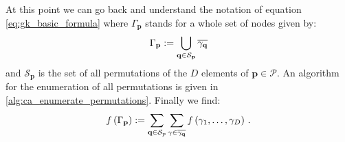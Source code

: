 \documentclass[a4paper,10pt]{article}
\begin{document}
At this point we can go back and understand
the notation of equation \eqref{eq:gk_basic_formula}
where $\Gamma_\mathbf{p}$ stands for a whole set of nodes given by:
\begin{equation}
  \Gamma_\mathbf{p} :=
  \bigcup_{\mathbf{q} \in \mathcal{S}_\mathbf{p}} \overline{\gamma_\mathbf{q}}
\end{equation}
and $\mathcal{S}_\mathbf{p}$ is the set of all permutations of the $D$
elements of $\mathbf{p} \in \mathcal{P}$. An algorithm for the enumeration
of all permutations is given in \eqref{alg:ca_enumerate_permutations}.
Finally we find:
\begin{equation}
  f\left(\Gamma_\mathbf{p}\right) :=
  \sum_{\mathbf{q} \in \mathcal{S}_p}
  \sum_{\gamma \in \overline{\gamma_\mathbf{q}}}
  f\left(\gamma_1, \ldots, \gamma_D\right) \,.
\end{equation}
\end{document}
